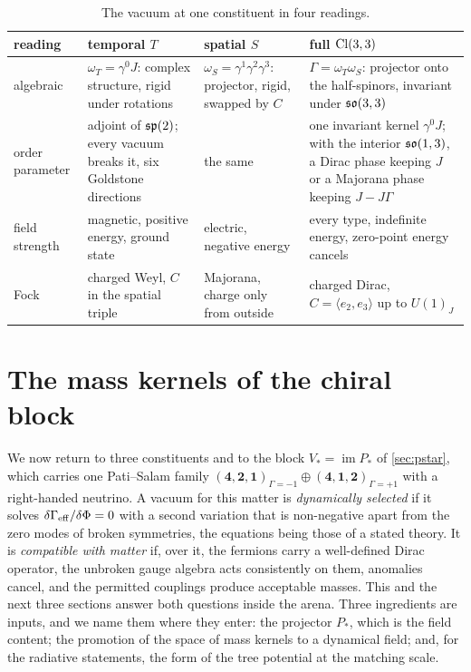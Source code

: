 \begin{table}[t]
\centering
\small
\begin{tabular}{@{}>{\raggedright\arraybackslash}p{2.2cm}>{\raggedright\arraybackslash}p{3.6cm}>{\raggedright\arraybackslash}p{3.6cm}>{\raggedright\arraybackslash}p{5.0cm}@{}}
\toprule
reading & temporal $T$ & spatial $S$ & full $\mathrm{Cl}(3,3)$\\
\midrule
algebraic & $\omega_T=\gamma^0J$: complex structure, rigid under rotations & $\omega_S=\gamma^1\gamma^2\gamma^3$: projector, rigid, swapped by $C$ &
$\Gamma=\omega_T\omega_S$: projector onto the half-spinors, invariant under $\mathfrak{so}(3,3)$\\
order parameter & adjoint of $\mathfrak{sp}(2)$; every vacuum breaks it, six Goldstone directions & the same & one invariant kernel $\gamma^0J$; with the interior
$\mathfrak{so}(1,3)$, a Dirac phase keeping $J$ or a Majorana phase keeping $J-J\Gamma$\\
field strength & magnetic, positive energy, ground state & electric, negative energy & every type, indefinite energy, zero-point energy cancels\\
Fock & charged Weyl, $C$ in the spatial triple & Majorana, charge only from outside & charged Dirac, $C=\langle e_2,e_3\rangle$ up to $U(1)_J$\\
\bottomrule
\end{tabular}
\caption{The vacuum at one constituent in four readings.}
\label{tab:fourreadings}
\end{table}



\section{The mass kernels of the chiral block}
\label{sec:kernels}

We now return to three constituents and to the block $V_*=\operatorname{im}P_*$ of \cref{sec:pstar}, which carries one Pati--Salam family
$(\mathbf4,\mathbf2,\mathbf1)_{\Gamma=-1}\oplus(\mathbf4,\mathbf1,\mathbf2)_{\Gamma=+1}$ with a right-handed neutrino. A vacuum for this matter is
\emph{dynamically selected} if it solves $\delta\Gamma_{\rm eff}/\delta\Phi=0$ with a second variation that is non-negative apart from the zero modes
of broken symmetries, the equations being those of a stated theory. It is \emph{compatible with matter} if, over it, the fermions carry a
well-defined Dirac operator, the unbroken gauge algebra acts consistently on them, anomalies cancel, and the permitted couplings produce
acceptable masses. This and the next three sections answer both questions inside the arena. Three ingredients are inputs, and we name them
where they enter: the projector $P_*$, which is the field content; the promotion of the space of mass kernels to a dynamical field; and, for
the radiative statements, the form of the tree potential at the matching scale.

